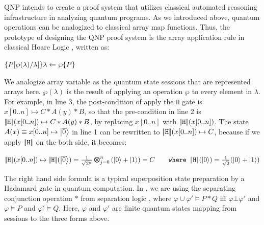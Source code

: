  QNP intends to create a proof system that utilizes classical automated reasoning infrastructure in analyzing quantum programs. As we introduced above, quantum operations can be analogized to classical array map functions.
Thus, the prototype of designing the QNP proof system is the array application rule in classical Hoare Logic \cite{Gordon12backgroundreading}, written as:

{\small
\begin{center}
$\{P[\wp(\lambda)/\lambda]\} {\lambda} \xleftarrow{} {\wp} \{P\}$
\end{center}
}

We analogize array variable as the quantum state sessions that are represented arrays here.
$\wp(\lambda)$ is the result of applying an operation $\wp$ to every element in $\lambda$. 
For example, in  line 3, the post-condition of apply the $\texttt{H}$ gate is $x[0..n] \mapsto C * A(y) * B$, so that the pre-condition in line 2 is $|\!| \texttt{H} |\!|(x[0..n]) \mapsto C * A(y) * B$, by replacing $x[0..n]$ with $|\!| \texttt{H} |\!|(x[0..n])$.
The state $A(x)\equiv x[0..n]\mapsto \left\vert{\overline{0}}\right\rangle$ in line 1 can be rewritten to $|\!| \texttt{H} |\!|(x[0..n]) \mapsto C$, because if we apply $|\!| \texttt{H} |\!|$ on the both side, it becomes:

{\small
\begin{center}
 $\dabs{\ihadh}(x[0..n]) \mapsto \dabs{\ihadh}(\ket{\overline{0}}) = \shad{2^n}{n}{} = C
\qquad 
\texttt{where}
\;\;
\dabs{\ihadh}(\ket{0})= \frac{1}{\sqrt{2}}(\ket{0}+\ket{1})
$
\end{center}
}

The right hand side formula is a typical superposition state preparation by a Hadamard gate in quantum computation.
In \qafny, we are using the separating conjunction operation $*$ from separation logic \cite{separationlogic}, where $\varphi \cup \varphi' \models P * Q$ iff $\varphi \bot \varphi'$ and $\varphi \models P$ and $\varphi' \models Q$. Here, $\varphi$ and $\varphi'$ are finite quantum states mapping from sessions to the three forms above.

